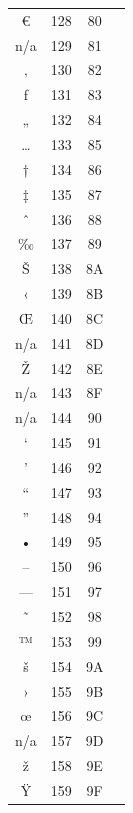 ﻿\documentclass[10pt]{article}
\begin{document}
\begin{tabular}{crcl}
€&128&80&\\
n/a&129&81&\\
‚&130&82&\\
ƒ&131&83&\\
„&132&84&\\
…&133&85&\\
†&134&86&\\
‡&135&87&\\
ˆ&136&88&\\
‰&137&89&\\
Š&138&8A&\\
‹&139&8B&\\
Œ&140&8C&\\
n/a&141&8D&\\
Ž&142&8E&\\
n/a&143&8F&\\
n/a&144&90&\\
‘&145&91&\\
’&146&92&\\
“&147&93&\\
”&148&94&\\
•&149&95&\\
–&150&96&\\
—&151&97&\\
˜&152&98&\\
™&153&99&\\
š&154&9A&\\
›&155&9B&\\
œ&156&9C&\\
n/a&157&9D&\\
ž&158&9E&\\
Ÿ&159&9F&\\
\end{tabular}
\end{document}
